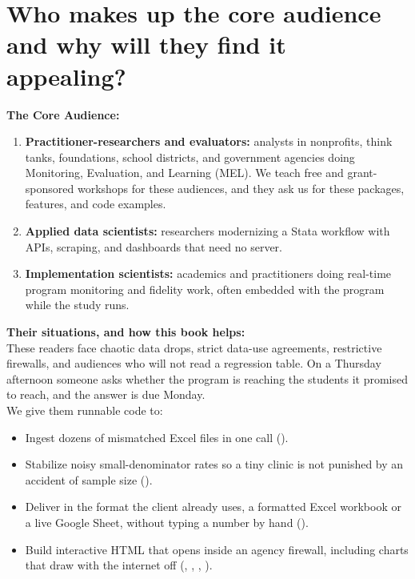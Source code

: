\documentclass[11pt]{article}
\begin{document}
\section*{Who makes up the core audience and why will they find it appealing?}

\textbf{The Core Audience:}
\begin{enumerate}
    \item \textbf{Practitioner-researchers and evaluators:} analysts in nonprofits, think tanks, foundations, school districts, and government agencies doing Monitoring, Evaluation, and Learning (MEL). We teach free and grant-sponsored workshops for these audiences, and they ask us for these packages, features, and code examples.
    \item \textbf{Applied data scientists:} researchers modernizing a Stata workflow with APIs, scraping, and dashboards that need no server.
    \item \textbf{Implementation scientists:} academics and practitioners doing real-time program monitoring and fidelity work, often embedded with the program while the study runs.
\end{enumerate}

\textbf{Their situations, and how this book helps:}\\
These readers face chaotic data drops, strict data-use agreements, restrictive firewalls, and audiences who will not read a regression table. On a Thursday afternoon someone asks whether the program is reaching the students it promised to reach, and the answer is due Monday.\\
We give them runnable code to:
\begin{itemize}
    \item Ingest dozens of mismatched Excel files in one call ().
    \item Stabilize noisy small-denominator rates so a tiny clinic is not punished by an accident of sample size ().
    \item Deliver in the format the client already uses, a formatted Excel workbook or a live Google Sheet, without typing a number by hand ().
    \item Build interactive HTML that opens inside an agency firewall, including charts that draw with the internet off (, , , ).
\end{itemize}
\end{document}
